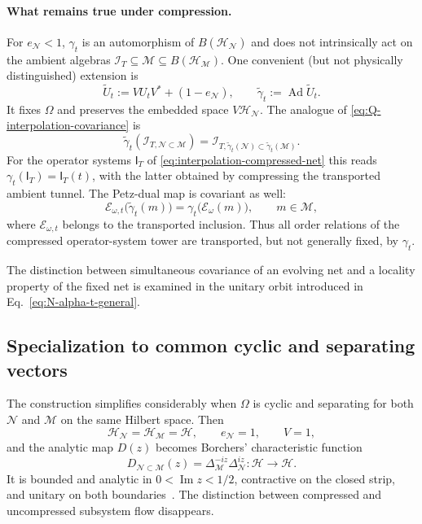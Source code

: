 \documentclass[a4paper,11pt]{article}
\theoremstyle{definition}
\newcommand{\mN}{\mathcal{N}}
\newcommand{\mI}{\mathcal{I}}
\newcommand{\mH}{\mathcal{H}}
\newcommand{\mM}{\mathcal{M}}
\newcommand{\mE}{\mathcal{E}}
\begin{document}
\paragraph{What remains true under compression.}
For $e_\mN<1$, $\gamma_t$ is an automorphism of
$B(\mH_\mN)$ and does not intrinsically act on the ambient
algebras $\mI_T\subseteq\mM\subseteq B(\mH_\mM)$.
One convenient (but not physically distinguished) extension is
\begin{equation}
 \widetilde U_t:=VU_tV^*+(1-e_\mN),
 \qquad \widetilde\gamma_t:=\operatorname{Ad}\widetilde U_t.
 \label{eq:Q-ambient-extended-flow}
\end{equation}
It fixes $\Omega$ and preserves the embedded space $V\mH_\mN$.
The analogue of \eqref{eq:Q-interpolation-covariance} is
\begin{equation}
 \widetilde\gamma_t(\mI_{T,\mN\subset\mM})
 =\mI_{T,\widetilde\gamma_t(\mN)\subset
              \widetilde\gamma_t(\mM)}.
 \label{eq:Q-compressed-tunnel-transport}
\end{equation}
For the operator systems $\mathsf I_T$ of
\eqref{eq:interpolation-compressed-net} this reads
$\gamma_t(\mathsf I_T)=\mathsf I_T(t)$, with the latter obtained
by compressing the transported ambient tunnel. The Petz-dual map
is covariant as well:
\begin{equation}
 \mE_{\omega,t}\bigl(\widetilde\gamma_t(m)\bigr)
 =\gamma_t\bigl(\mE_\omega(m)\bigr),
 \qquad m\in\mM,
 \label{eq:Q-Petz-covariance}
\end{equation}
where $\mE_{\omega,t}$ belongs to the transported inclusion.
Thus all order relations of the compressed operator-system tower
are transported, but not generally fixed, by $\gamma_t$.

The distinction between simultaneous covariance of an evolving net
and a locality property of the fixed net is examined in
the unitary orbit introduced in Eq.~\eqref{eq:N-alpha-t-general}.

\subsection{Specialization to common cyclic and separating vectors}
\label{subsec:probing-common-cyclic}

The construction simplifies considerably when $\Omega$ is cyclic and
separating for both $\mN$ and $\mM$ on the same Hilbert space.
Then
\begin{equation}
    \mH_{\mN}=\mH_{\mM}=\mathcal H,
    \qquad
    e_{\mN}=1,
    \qquad
    V=1,
\end{equation}
and the analytic map $D(z)$ becomes Borchers' characteristic function
\begin{equation}
    \boxed{
    D_{\mN\subset\mM}(z)
    =
    \Delta_{\mM}^{-iz}\Delta_{\mN}^{iz}
    :
    \mathcal H\to\mathcal H .
    }
    \label{eq:D-common-probing}
\end{equation}
It is bounded and analytic in
$0<\operatorname{Im}z<1/2$, contractive on the closed strip, and unitary on
both boundaries~\cite{revolutionizing}. The distinction between compressed
and uncompressed subsystem flow disappears.
\end{document}
